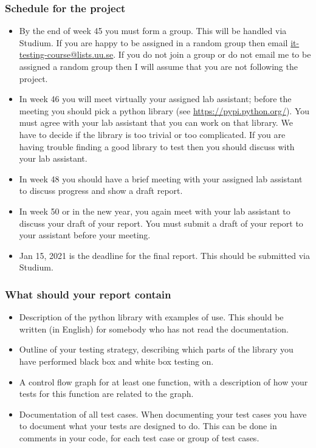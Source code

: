 \documentclass[a4paper]{article}
\begin{document}
\subsubsection*{Schedule for the project}
  \begin{itemize}
  \item By the end of  week 45 you must form a
    group. This will be handled via Studium.  If you are happy to be
    assigned in a random group then email
    \url{it-testing-course@lists.uu.se}. If you do not  join a group
    or do not email me to be assigned a random group then I will
    assume that you are not following the project. 
  \item In week 46 you will meet virtually your assigned lab assistant; before
    the meeting you should pick a python library (see 
    \url{https://pypi.python.org/}). You must agree with your lab
    assistant that you can work on that library. We have to decide if
    the library is too trivial or too complicated. If you are having
    trouble finding a good library to test then you should discuss
    with your lab assistant. 
  \item In week  48 you should have a brief meeting with your assigned lab
    assistant to discuss progress and show a draft report. 

  \item In week 50 or in the new year, you again meet with your
    lab assistant to discuss your draft of your report. You must
    submit a draft of your report to your assistant before your
    meeting.
    \item Jan 15,  2021 is  the deadline for the final
      report. This should be submitted via Studium. 

\end{itemize}



  \subsubsection*{What should your report contain}
  \begin{itemize}
  \item Description of the python library with examples of use. 
  This should be written (in English) for somebody who has not read the documentation.
  \item Outline of your testing strategy, describing which parts of the library 
    you have performed black box and white box testing on.
  \item A control flow graph for at least one function, with a description of 
    how your tests for this function are related to the graph.
  \item Documentation of all test cases.  When documenting your test cases
    you have to document what your tests are designed to do. This can be done
    in comments in your code, for each test case or group of test cases.
  \end{itemize}
\end{document}
